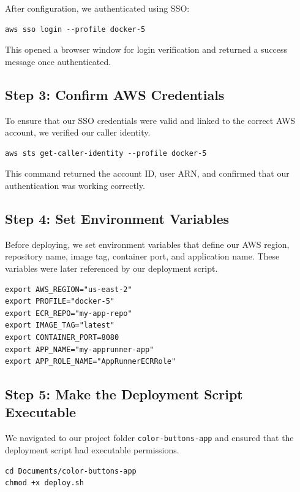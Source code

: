After configuration, we authenticated using SSO:

\begin{verbatim}
aws sso login --profile docker-5
\end{verbatim}

This opened a browser window for login verification and returned a success message once authenticated.

\subsection{Step 3: Confirm AWS Credentials}

To ensure that our SSO credentials were valid and linked to the correct AWS account, we verified our caller identity.

\begin{verbatim}
aws sts get-caller-identity --profile docker-5
\end{verbatim}

This command returned the account ID, user ARN, and confirmed that our authentication was working correctly.

\subsection{Step 4: Set Environment Variables}

Before deploying, we set environment variables that define our AWS region, repository name, image tag, container port, and application name. These variables were later referenced by our deployment script.

\begin{verbatim}
export AWS_REGION="us-east-2"
export PROFILE="docker-5"
export ECR_REPO="my-app-repo"
export IMAGE_TAG="latest"
export CONTAINER_PORT=8080
export APP_NAME="my-apprunner-app"
export APP_ROLE_NAME="AppRunnerECRRole"
\end{verbatim}

\subsection{Step 5: Make the Deployment Script Executable}

We navigated to our project folder \texttt{color-buttons-app} and ensured that the deployment script had executable permissions.

\begin{verbatim}
cd Documents/color-buttons-app
chmod +x deploy.sh
\end{verbatim}

